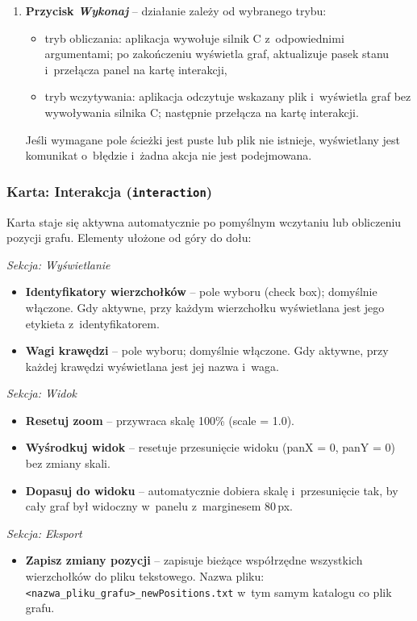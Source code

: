 \documentclass[12pt,a4paper]{article}
\begin{document}
\begin{enumerate}
    \item \textbf{Przycisk \textit{Wykonaj}} -- działanie zależy od wybranego trybu:
    \begin{itemize}
        \item tryb obliczania: aplikacja wywołuje silnik C z~odpowiednimi argumentami; po zakończeniu wyświetla graf, aktualizuje pasek stanu i~przełącza panel na kartę interakcji,
        \item tryb wczytywania: aplikacja odczytuje wskazany plik i~wyświetla graf bez wywoływania silnika C; następnie przełącza na kartę interakcji.
    \end{itemize}
    Jeśli wymagane pole ścieżki jest puste lub plik nie istnieje, wyświetlany jest komunikat o~błędzie i~żadna akcja nie jest podejmowana.
\end{enumerate}

\subsubsection{Karta: Interakcja (\texttt{interaction})}

Karta staje się aktywna automatycznie po pomyślnym wczytaniu lub obliczeniu pozycji grafu. Elementy ułożone od góry do dołu:

\textit{Sekcja: Wyświetlanie}
\begin{itemize}
    \item \textbf{Identyfikatory wierzchołków} -- pole wyboru (check box); domyślnie włączone. Gdy aktywne, przy każdym wierzchołku wyświetlana jest jego etykieta z~identyfikatorem.
    \item \textbf{Wagi krawędzi} -- pole wyboru; domyślnie włączone. Gdy aktywne, przy każdej krawędzi wyświetlana jest jej nazwa i~waga.
\end{itemize}

\textit{Sekcja: Widok}
\begin{itemize}
    \item \textbf{Resetuj zoom} -- przywraca skalę 100\% (scale = 1.0).
    \item \textbf{Wyśrodkuj widok} -- resetuje przesunięcie widoku (panX = 0, panY = 0) bez zmiany skali.
    \item \textbf{Dopasuj do widoku} -- automatycznie dobiera skalę i~przesunięcie tak, by cały graf był widoczny w~panelu z~marginesem 80\,px.
\end{itemize}

\textit{Sekcja: Eksport}
\begin{itemize}
    \item \textbf{Zapisz zmiany pozycji} -- zapisuje bieżące współrzędne wszystkich wierzchołków do pliku tekstowego. Nazwa pliku: \texttt{<nazwa\_pliku\_grafu>\_newPositions.txt} w~tym samym katalogu co plik grafu.
\end{itemize}
\end{document}
